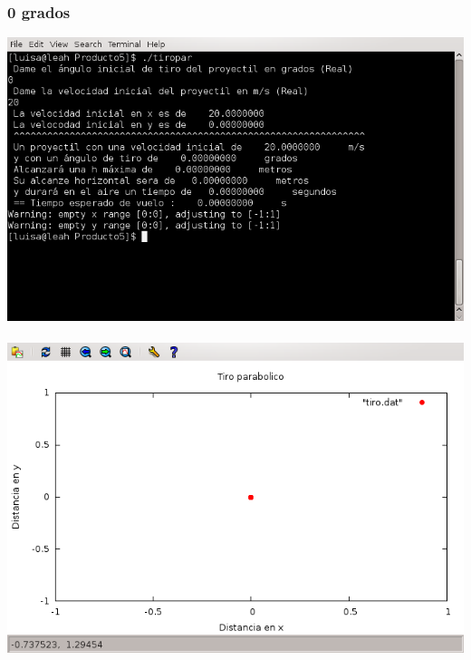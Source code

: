 \documentclass[10pt]{article}
\begin{document}
\subsubsection{0 grados}
\includegraphics[scale=0.6]{screen0.png} \\
\\
\includegraphics[scale=0.6]{grafica0.png}
\end{document}
